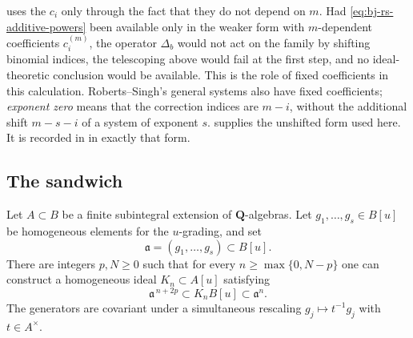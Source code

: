 \begin{remark}
\label{rem:ch44-exponent-zero}
 uses the $c_i$ only through the fact
that they do not depend on $m$.  Had \eqref{eq:bj-rs-additive-powers} been
available only in the weaker form with $m$-dependent coefficients
$c_i^{(m)}$, the operator $\Delta_b$ would not act on the family by
shifting binomial indices, the telescoping above would fail at the first
step, and no ideal-theoretic conclusion would be available.  This is the
role of fixed coefficients in this calculation.  Roberts--Singh's
general systems also have fixed coefficients; \emph{exponent zero}
means that the correction indices are $m-i$, without the additional
shift $m-s-i$ of a system of exponent $s$.
\cite[Proposition~4.2 and Corollary~4.3]{RobertsSingh} supplies the
unshifted form used here.  It is recorded in 
in exactly that form.
\end{remark}

\subsection{The sandwich}
\label{sec:ch44-sandwich-proof}

\begin{lemma}\label{lem:bj-local-additive-sandwich}
Let $A\subset B$ be a finite subintegral extension of
$\mathbf Q$-algebras.
Let $g_1,\ldots,g_s\in B[u]$ be homogeneous elements for the
$u$-grading, and set
\[
                         \mathfrak a=(g_1,\ldots,g_s)\subset B[u].
\]
There are integers $p,N\ge0$ such that for every
$n\ge\max\{0,N-p\}$ one can construct a homogeneous ideal
$K_n\subset A[u]$ satisfying
\[
             \mathfrak a^{\,n+2p}
               \subset K_nB[u]
               \subset\mathfrak a^n.
\tag{44.4}\label{eq:bj-local-additive-sandwich}
\]
The generators are covariant under a simultaneous rescaling
$g_j\mapsto t^{-1}g_j$ with $t\in A^\times$.
\end{lemma}

